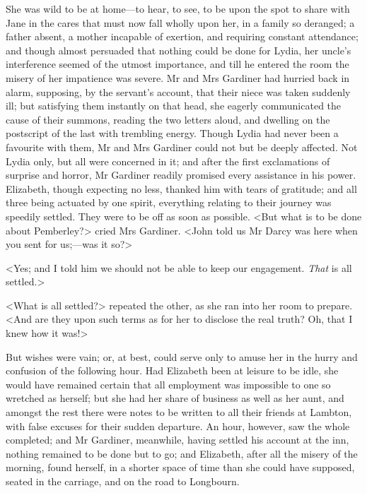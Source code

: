 She was wild to be at home—to hear, to see, to be upon the spot to share with Jane in the cares that must now fall wholly upon her, in a family so deranged; a father absent, a mother incapable of exertion, and requiring constant attendance; and though almost persuaded that nothing could be done for Lydia, her uncle's interference seemed of the utmost importance, and till he entered the room the misery of her impatience was severe. Mr and Mrs Gardiner had hurried back in alarm, supposing, by the servant's account, that their niece was taken suddenly ill; but satisfying them instantly on that head, she eagerly communicated the cause of their summons, reading the two letters aloud, and dwelling on the postscript of the last with trembling energy. Though Lydia had never been a favourite with them, Mr and Mrs Gardiner could not but be deeply affected. Not Lydia only, but all were concerned in it; and after the first exclamations of surprise and horror, Mr Gardiner readily promised every assistance in his power. Elizabeth, though expecting no less, thanked him with tears of gratitude; and all three being actuated by one spirit, everything relating to their journey was speedily settled. They were to be off as soon as possible. <But what is to be done about Pemberley?> cried Mrs Gardiner. <John told us Mr Darcy was here when you sent for us;—was it so?>

<Yes; and I told him we should not be able to keep our engagement. \textit{That} is all settled.>

<What is all settled?> repeated the other, as she ran into her room to prepare. <And are they upon such terms as for her to disclose the real truth? Oh, that I knew how it was!>

But wishes were vain; or, at best, could serve only to amuse her in the hurry and confusion of the following hour. Had Elizabeth been at leisure to be idle, she would have remained certain that all employment was impossible to one so wretched as herself; but she had her share of business as well as her aunt, and amongst the rest there were notes to be written to all their friends at Lambton, with false excuses for their sudden departure. An hour, however, saw the whole completed; and Mr Gardiner, meanwhile, having settled his account at the inn, nothing remained to be done but to go; and Elizabeth, after all the misery of the morning, found herself, in a shorter space of time than she could have supposed, seated in the carriage, and on the road to Longbourn.